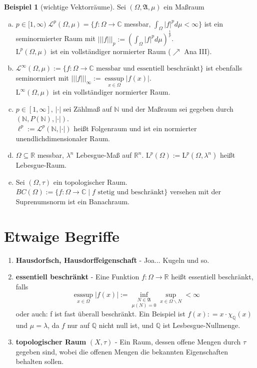 \documentclass[ngerman]{report}
\theoremstyle{definition}%
\newtheorem{bsp}[section]{Beispiel}
\newcommand{\C}{\mathbb{C}}
\newcommand{\R}{\mathbb{R}}
\newcommand{\Q}{\mathbb{Q}}
\newcommand{\N}{\mathbb{N}}
\newcommand{\hA}{\mathfrak{A}}
\newcommand{\hL}{\mathcal{L}}
\newcommand{\nL}{\text{L}}
\newcommand{\ess}{\text{ess}}
\begin{document}
\begin{bsp}[wichtige Vektorräume]
Sei $(\Omega,\hA,\mu)$ ein Maßraum
\begin{enumerate}[(a)]
\item $p\in[1,\infty)\; \hL^p(\Omega,\mu) = \{f:\Omega \rightarrow \C$ messbar, $\int_\Omega |f|^p d\mu < \infty \}$ ist ein seminormierter Raum mit $|||f|||_p := (\int_\Omega |f|^p d\mu )^{\frac{1}{p}}$.\\
$\text{L}^p(\Omega,\mu)$ ist ein vollständiger normierter Raum ($\nearrow$ Ana III).

\item $\hL^\infty(\Omega,\mu) := \{f:\Omega \rightarrow \C \text{ messbar und essentiell beschränkt} \}$ ist ebenfalls seminormiert mit $|||f|||_\infty := \underset{x\in\Omega}{\ess \sup} |f(x)|$.\\
$\text{L}^\infty(\Omega,\mu)$ ist ein vollständiger normierter Raum.

\item $p\in [1,\infty],\, |\cdot|$ sei Zählmaß auf $\N$ und der Maßraum sei gegeben durch $(\N, P(\N), |\cdot|)$.\\
$\ell^p := \hL^p(\N, |\cdot|)$ heißt Folgenraum und ist ein normierter unendlichdimensionaler Raum.

\item $\Omega \subseteq \R$ messbar, $\lambda^n$ Lebesgue-Maß auf $\R^n$. $\nL^p(\Omega) :=
\nL^p(\Omega,\lambda^n)$ heißt Lebesgue-Raum.

\item Sei $(\Omega, \tau)$ ein topologischer Raum. $BC(\Omega) := \{ f: \Omega \rightarrow \C\;|\;f \text{ stetig und beschränkt} \}$ versehen mit der Suprenumsnorm ist ein Banachraum.
\end{enumerate}
\end{bsp}


\section*{Etwaige Begriffe}
\begin{enumerate}
\item \textbf{Hausdorfsch, Hausdorffeigenschaft} -  Joa... Kugeln und so.
\item \textbf{essentiell beschränkt} - Eine Funktion $f: \Omega \rightarrow \R$ heißt essentiell beschränkt, falls 
$$\underset{x\in\Omega}{\ess \sup} |f(x)| := \underset{{\mu(N) = 0}}{ \inf_{N \in \hA} }  \sup_{x\in \Omega\backslash N} < \infty$$
oder auch: f ist fast überall beschränkt. Ein Beispiel ist $f(x) : = x\cdot \chi_\Q(x)$ und $\mu = \lambda$, da $f$ nur auf $\Q$ nicht null ist, und $\Q$ ist Lesbesgue-Nullmenge. 
\item \textbf{topologischer Raum} $(X,\tau)$ - Ein Raum, dessen offene Mengen durch $\tau$ gegeben sind, wobei die offenen Mengen die bekannten Eigenschaften behalten sollen.


\end{enumerate}
\end{document}
